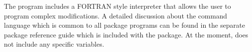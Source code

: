 The program includes a FORTRAN style interpreter that allows the
user to program complex modifications. A detailed discussion about the 
command language which is common to all \Discus package programs can be 
found in the separate \Discus package reference guide which is included with 
the package. At the moment, \Suite does not include any specific
variables.

